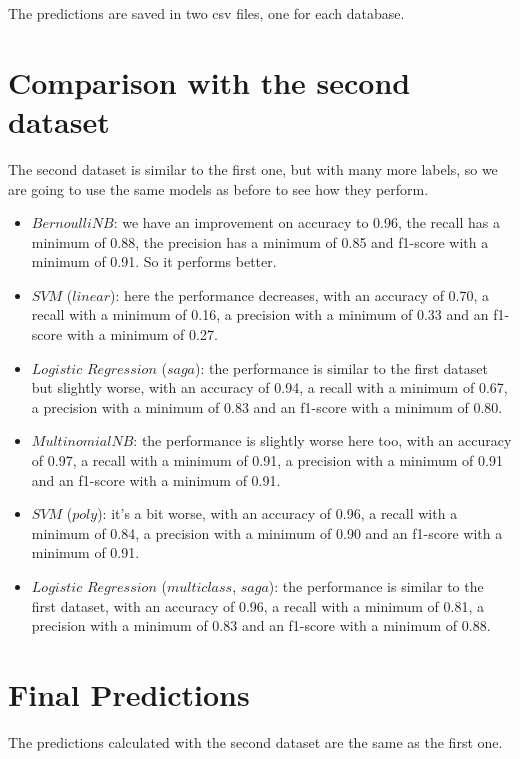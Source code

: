 \documentclass{article}
\begin{document}
\begin{titlepage}
  The predictions are saved in two csv files, one for each database.

  \newpage

  \section*{Comparison with the second dataset}
  The second dataset is similar to the first one, but with many more labels, so we are going to use the same models as before to see how they perform.

  \begin{itemize}
    \item $BernoulliNB$: we have an improvement on accuracy to 0.96, the recall has a minimum of 0.88, the precision has a minimum of 0.85 and f1-score with a minimum of 0.91. So it performs better.
    \item $SVM$ ($linear$): here the performance decreases, with an accuracy of 0.70, a recall with a minimum of 0.16, a precision with a minimum of 0.33 and an f1-score with a minimum of 0.27.
    \item $Logistic$ $Regression$ ($saga$): the performance is similar to the first dataset but slightly worse, with an accuracy of 0.94, a recall with a minimum of 0.67, a precision with a minimum of 0.83 and an f1-score with a minimum of 0.80.
    \item $MultinomialNB$: the performance is slightly worse here too, with an accuracy of 0.97, a recall with a minimum of 0.91, a precision with a minimum of 0.91 and an f1-score with a minimum of 0.91.
    \item $SVM$ ($poly$): it's a bit worse, with an accuracy of 0.96, a recall with a minimum of 0.84, a precision with a minimum of 0.90 and an f1-score with a minimum of 0.91.
    \item $Logistic$ $Regression$ ($multiclass$, $saga$): the performance is similar to the first dataset, with an accuracy of 0.96, a recall with a minimum of 0.81, a precision with a minimum of 0.83 and an f1-score with a minimum of 0.88.
  \end{itemize}

  \section{Final Predictions}
  The predictions calculated with the second dataset are the same as the first one.

\end{titlepage}
\end{document}

